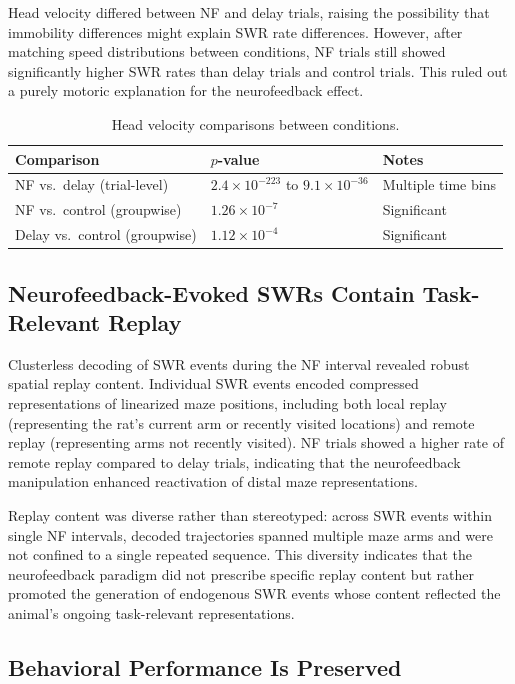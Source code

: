 \documentclass[11pt]{article}
\begin{document}
Head velocity differed between NF and delay trials, raising the possibility that immobility differences might explain SWR rate differences. However, after matching speed distributions between conditions, NF trials still showed significantly higher SWR rates than delay trials and control trials. This ruled out a purely motoric explanation for the neurofeedback effect.

\begin{table}[ht]
\centering
\caption{Head velocity comparisons between conditions.}
\label{tab:speed}
\begin{tabular}{lll}
\toprule
Comparison & $p$-value & Notes \\
\midrule
NF vs.\ delay (trial-level) & $2.4 \times 10^{-223}$ to $9.1 \times 10^{-36}$ & Multiple time bins \\
NF vs.\ control (groupwise) & $1.26 \times 10^{-7}$ & Significant \\
Delay vs.\ control (groupwise) & $1.12 \times 10^{-4}$ & Significant \\
\bottomrule
\end{tabular}
\end{table}

\subsection{Neurofeedback-Evoked SWRs Contain Task-Relevant Replay}

Clusterless decoding of SWR events during the NF interval revealed robust spatial replay content. Individual SWR events encoded compressed representations of linearized maze positions, including both local replay (representing the rat's current arm or recently visited locations) and remote replay (representing arms not recently visited). NF trials showed a higher rate of remote replay compared to delay trials, indicating that the neurofeedback manipulation enhanced reactivation of distal maze representations.

Replay content was diverse rather than stereotyped: across SWR events within single NF intervals, decoded trajectories spanned multiple maze arms and were not confined to a single repeated sequence. This diversity indicates that the neurofeedback paradigm did not prescribe specific replay content but rather promoted the generation of endogenous SWR events whose content reflected the animal's ongoing task-relevant representations.

\subsection{Behavioral Performance Is Preserved}
\end{document}
